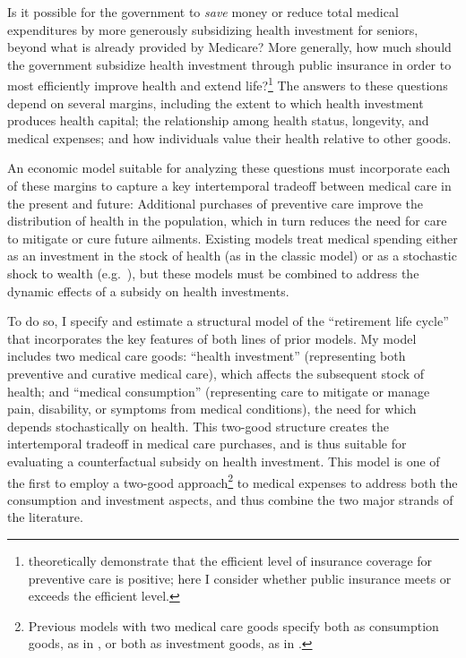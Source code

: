 \documentclass[12pt,pdftex,letterpaper]{article}
\begin{document}
Is it possible for the government to \textit{save} money or reduce total medical expenditures by more generously subsidizing health investment for seniors, beyond what is already provided by Medicare?  More generally, how much should the government subsidize health investment through public insurance in order to most efficiently improve health and extend life?\footnote{\cite{ellis07} theoretically demonstrate that the efficient level of insurance coverage for preventive care is positive; here I consider whether public insurance meets or exceeds the efficient level.}  The answers to these questions depend on several margins, including the extent to which health investment produces health capital; the relationship among health status, longevity, and medical expenses; and how individuals value their health relative to other goods.

An economic model suitable for analyzing these questions must incorporate each of these margins to capture a key intertemporal tradeoff between medical care in the present and future: Additional purchases of preventive care improve the distribution of health in the population, which in turn reduces the need for care to mitigate or cure future ailments.  Existing models treat medical spending either as an investment in the stock of health (as in the classic \cite{grossman72} model) or as a stochastic shock to wealth (e.g.\ \cite{dinardi10}), but these models must be combined to address the dynamic effects of a subsidy on health investments.

To do so, I specify and estimate a structural model of the ``retirement life cycle'' that incorporates the key features of both lines of prior models.  My model includes two medical care goods: ``health investment'' (representing both preventive and curative medical care), which affects the subsequent stock of health; and ``medical consumption'' (representing care to mitigate or manage pain, disability, or symptoms from medical conditions), the need for which depends stochastically on health.  This two-good structure creates the intertemporal tradeoff in medical care purchases, and is thus suitable for evaluating a counterfactual subsidy on health investment.  This model is one of the first to employ a two-good approach\footnote{Previous models with two medical care goods specify both as consumption goods, as in \cite{blau08}, or both as investment goods, as in \cite{ozkan14}.} to medical expenses to address both the consumption and investment aspects, and thus combine the two major strands of the literature.
\end{document}
